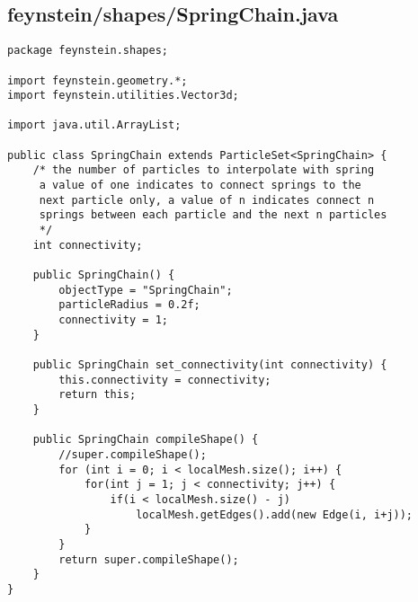 \subsection*{feynstein/shapes/SpringChain.java}
\begin{lstlisting}
package feynstein.shapes;

import feynstein.geometry.*;
import feynstein.utilities.Vector3d;

import java.util.ArrayList;

public class SpringChain extends ParticleSet<SpringChain> {
	/* the number of particles to interpolate with spring
	 a value of one indicates to connect springs to the
	 next particle only, a value of n indicates connect n
	 springs between each particle and the next n particles
	 */
	int connectivity;
	
	public SpringChain() {
		objectType = "SpringChain";
		particleRadius = 0.2f;
		connectivity = 1;
	}

	public SpringChain set_connectivity(int connectivity) {
		this.connectivity = connectivity;
		return this;
	}
	
    public SpringChain compileShape() {
		//super.compileShape();
		for (int i = 0; i < localMesh.size(); i++) {
			for(int j = 1; j < connectivity; j++) {
				if(i < localMesh.size() - j)
					localMesh.getEdges().add(new Edge(i, i+j));
			}
		}
		return super.compileShape();
    }
}\end{lstlisting}

